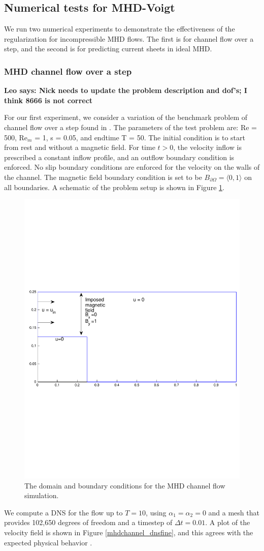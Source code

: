 \documentclass[11pt]{article}%
\numberwithin{equation}{section}
\begin{document}
\subsection{Numerical tests for MHD-Voigt}

We run two numerical experiments to demonstrate the effectiveness of the regularization for incompressible MHD flows.  The first is for channel flow over a step, and the second is for predicting current sheets in ideal MHD.

\subsubsection{MHD channel flow over a step}

{\bf Leo says: Nick needs to update the problem description and dof's; I think 8666 is not correct}

For our first experiment, we consider a variation of the benchmark problem of channel flow
over a step found in \cite{CS06,Gerbeau00,W12}.  The parameters of the test problem are:
Re = 500, Re$_m$ = 1, s = 0.05, and endtime T = 50. The initial condition is to start from rest and without
a magnetic field.  For time $t>0$, the velocity inflow is prescribed a constant inflow profile, and an outflow
boundary condition is enforced.  No slip boundary conditions are enforced for the velocity on the walls of the channel.
The magnetic field boundary condition is set to be $B_{\partial\Omega}=\langle 0, 1 \rangle$ on all boundaries.  A schematic of the problem setup is shown in Figure \ref{stepdomain}.

\begin{figure}[htb]
\begin{center}
\includegraphics[width=1\textwidth,height=0.3\textwidth, viewport=0 250 640 550, clip]{Domain.pdf}
\caption{\label{stepdomain} The domain and boundary conditions for the MHD channel flow simulation.}
\end{center}
\end{figure}

We compute a DNS for the flow up to $T=10$, using $\alpha_1=\alpha_2=0$ and a mesh that provides 102,650 degrees of freedom and a timestep of $\Delta t=0.01$.  A plot of the velocity field is shown in Figure \ref{mhdchannel_dnsfine}, and this agrees with the expected physical behavior \cite{CS06,Gerbeau00,W12}.
\end{document}
